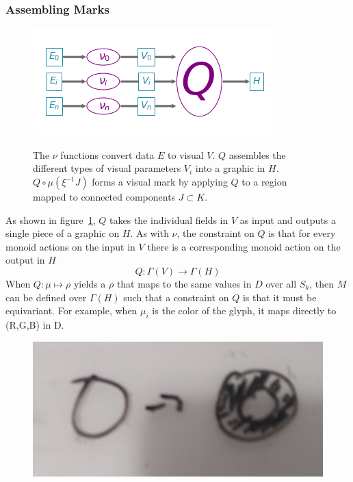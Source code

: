 \documentclass[../main.tex]{subfiles}
\begin{document}
\subsubsection{Assembling Marks}
\label{sec:artist_q}
\begin{figure}[H]
    \includegraphics[width=\textwidth]{figures/math/path_of_q}
    \label{fig:artist_q}
    \caption{The $\nu$ functions convert data $E$ to visual $V$. $Q$ assembles the different types of visual parameters $V_{i}$ into a graphic in $H$. $Q\circ\mu(\xi^{-1}J)$ forms a visual mark by applying $Q$ to a region mapped to connected components $J \subset K$.}
\end{figure}

As shown in figure~\ref{fig:artist_q}, $Q$ takes the individual fields in $V$ as input and outputs a single piece of a graphic on $H$. As with $\nu$, the constraint on $Q$ is that for every monoid actions on the input in $V$ there is a corresponding monoid action on the output in $H$
\begin{equation}
    Q: \Gamma(V) \rightarrow \Gamma(H)
\end{equation}
When $Q: \mu \mapsto \rho$ yields a $\rho$ that maps to the same values in $D$ over all $S_k$, then $M$ can be defined over $\Gamma(H)$ such that a constraint on $Q$ is that it must be equivariant. For example, when $\mu_{i}$ is the color of the glyph, it maps directly to (R,G,B) in D.

\begin{figure}[H]
    \includegraphics[width=\textwidth]{figures/math/diff_type_q.png}
    \label{fig:artist_mark_change}
\end{figure}
\end{document}

